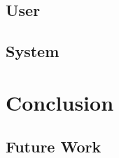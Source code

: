 \documentclass{l4proj}
\begin{document}
\section{User}
\section{System}

\chapter{Conclusion}
\section{Future Work}
\section{}


\end{document}
